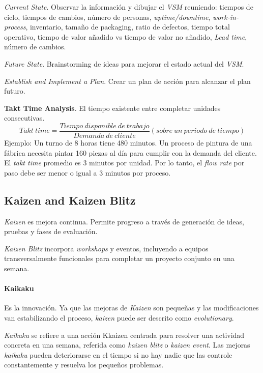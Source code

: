 \documentclass[]{article}
\begin{document}
\textit{Current State}. Observar la información y dibujar el \textit{VSM} reuniendo: tiempos de ciclo, tiempos de cambios, número de personas, \textit{uptime/downtime}, \textit{work-in-process}, inventario, tamaño de packaging, ratio de defectos, tiempo total operativo, tiempo de valor añadido vs tiempo de valor no añadido, \textit{Lead time}, número de cambios.

\textit{Future State}. Brainstorming de ideas para mejorar el estado actual del \textit{VSM}.

\textit{Establish and Implement a Plan}. Crear un plan de acción para alcanzar el plan futuro.

\textbf{Takt Time Analysis}. El tiempo existente entre completar unidades consecutivas.
\begin{equation}
Takt \ time = \frac{Tiempo \ disponible \ de \ trabajo}{Demanda \ de \ cliente} (sobre \ un \ periodo \ de \ tiempo)
\end{equation}
Ejemplo: Un turno de 8 horas tiene 480 minutos. Un proceso de pintura de una fábrica necesita pintar 160 piezas al día para cumplir con la demanda del cliente. El \textit{takt time} promedio es 3 minutos por unidad. Por lo tanto, el \textit{flow rate} por paso debe ser menor o igual a 3 minutos por proceso.

\subsection{Kaizen and Kaizen Blitz}

\textit{Kaizen} es mejora continua. Permite progreso a través de generación de ideas, pruebas y fases de evaluación. 

\textit{Kaizen Blitz} incorpora \textit{workshops} y eventos, incluyendo a equipos transversalmente funcionales para completar un proyecto conjunto en una semana.

\paragraph{Kaikaku}

Es la innovación. Ya que las mejoras de \textit{Kaizen} son pequeñas y las modificaciones van estabilizando el proceso, \textit{kaizen} puede ser descrito como \textit{evolutionary}. 

\textit{Kaikaku} se refiere a una acción Kkaizen centrada para resolver una actividad concreta en una semana, referida como \textit{kaizen blitz} o \textit{kaizen event}. Las mejoras \textit{kaikaku} pueden deteriorarse en el tiempo si no hay nadie que las controle constantemente y resuelva los pequeños problemas.
\end{document}
